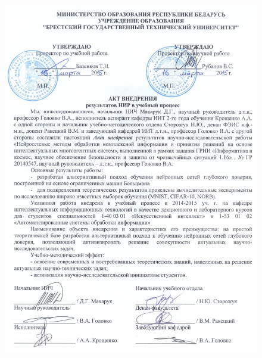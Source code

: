 \begin{figure}[ht]
	\centering
	\includegraphics[height=23cm]{man-source/images/appendix/appendixActs/bstu_act.jpg}
\end{figure}

